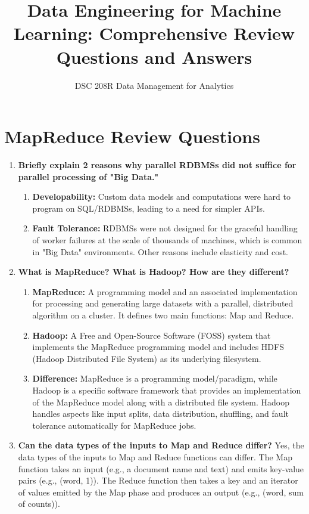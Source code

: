 \documentclass{article}
\title{Data Engineering for Machine Learning: Comprehensive Review Questions and Answers}
\author{DSC 208R Data Management for Analytics}
\date{}
\begin{document}
\maketitle

\section*{MapReduce Review Questions}

\begin{enumerate}
    \item \textbf{Briefly explain 2 reasons why parallel RDBMSs did not suffice for parallel processing of "Big Data."}
    \begin{enumerate}[label=\alph*)]
        \item \textbf{Developability:} Custom data models and computations were hard to program on SQL/RDBMSs, leading to a need for simpler APIs.
        \item \textbf{Fault Tolerance:} RDBMSs were not designed for the graceful handling of worker failures at the scale of thousands of machines, which is common in "Big Data" environments. Other reasons include elasticity and cost.
    \end{enumerate}

    \item \textbf{What is MapReduce? What is Hadoop? How are they different?}
    \begin{enumerate}[label=\alph*)]
        \item \textbf{MapReduce:} A programming model and an associated implementation for processing and generating large datasets with a parallel, distributed algorithm on a cluster. It defines two main functions: Map and Reduce.
        \item \textbf{Hadoop:} A Free and Open-Source Software (FOSS) system that implements the MapReduce programming model and includes HDFS (Hadoop Distributed File System) as its underlying filesystem.
        \item \textbf{Difference:} MapReduce is a programming model/paradigm, while Hadoop is a specific software framework that provides an implementation of the MapReduce model along with a distributed file system. Hadoop handles aspects like input splits, data distribution, shuffling, and fault tolerance automatically for MapReduce jobs.
    \end{enumerate}

    \item \textbf{Can the data types of the inputs to Map and Reduce differ?}
    Yes, the data types of the inputs to Map and Reduce functions can differ. The Map function takes an input (e.g., a document name and text) and emits key-value pairs (e.g., (word, 1)). The Reduce function then takes a key and an iterator of values emitted by the Map phase and produces an output (e.g., (word, sum of counts)).


\end{enumerate}
\end{document}
